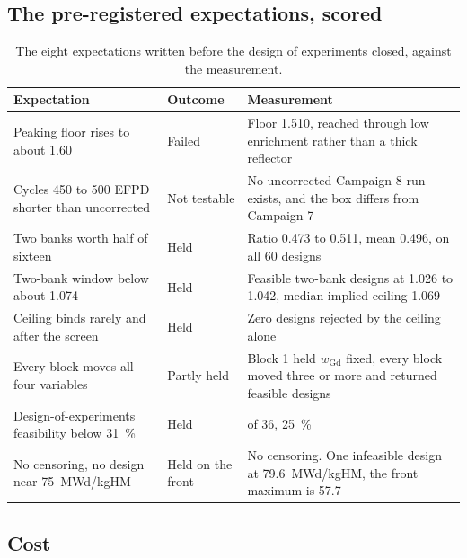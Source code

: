 \subsection{The pre-registered expectations, scored}
\label{sec:res-c8-hyp}

\begin{table}[htbp]
  \centering
  \small
  \caption{The eight expectations written before the design of
  experiments closed, against the measurement.}
  \label{tab:c8-hyp-scored}
  \begin{tabularx}{\textwidth}{@{}>{\raggedright\arraybackslash}X>{\raggedright\arraybackslash}p{1.6cm}>{\raggedright\arraybackslash}X@{}}
    \toprule
    Expectation & Outcome & Measurement \\
    \midrule
    Peaking floor rises to about 1.60 & Failed & Floor 1.510, reached through low enrichment rather than a thick reflector \\
    Cycles 450 to 500 EFPD shorter than uncorrected & Not testable & No uncorrected Campaign 8 run exists, and the box differs from Campaign 7 \\
    Two banks worth half of sixteen & Held & Ratio 0.473 to 0.511, mean 0.496, on all 60 designs \\
    Two-bank window below about 1.074 & Held & Feasible two-bank designs at 1.026 to 1.042, median implied ceiling 1.069 \\
    Ceiling binds rarely and after the screen & Held & Zero designs rejected by the ceiling alone \\
    Every block moves all four variables & Partly held & Block 1 held $w_\mathrm{Gd}$ fixed, every block moved three or more and returned feasible designs \\
    Design-of-experiments feasibility below \SI{31}{\%} & Held & 9 of 36, \SI{25}{\%} \\
    No censoring, no design near \SI{75}{MWd/kgHM} & Held on the front & No censoring. One infeasible design at \SI{79.6}{MWd/kgHM}, the front maximum is 57.7 \\
    \bottomrule
  \end{tabularx}
\end{table}

\subsection{Cost}
\label{sec:res-c8-cost}

